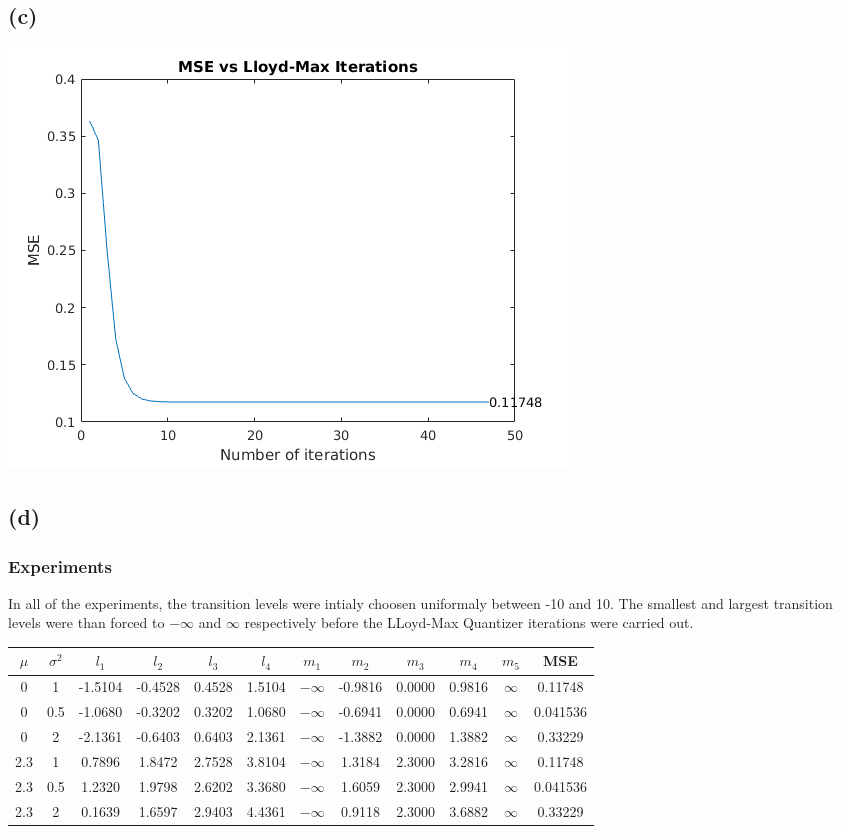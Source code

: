 \documentclass[a4paper,fleqn,11pt]{article}
\theoremstyle{mytheor}
\begin{document}
\subsection*{(c)}
\begin{center}
\includegraphics[scale=0.70]{../results/lloyd.png}
\end{center}
\subsection*{(d)}
\subsubsection*{Experiments}
In all of the experiments, the transition levels were intialy choosen uniformaly between -10 and 10. The smallest and largest transition levels were than forced to $-\infty$ and $\infty$ respectively before the LLoyd-Max Quantizer iterations were carried out. \\
\begin{tabular}{| c | c | c | c | c | c | c | c | c | c | c | c |}
	\hline
	$\mu$ &	$\sigma^2$ &$l_1$ &		$l_2$ &		$l_3$ &		$l_4$ &		$m_1$ &		$m_2$ &			$m_3$ &		$m_4$ &		$m_5$ &		MSE \\
	\hline
	0 &		1 &			-1.5104 &	-0.4528 &	0.4528 &	1.5104 &	$-\infty$ &	-0.9816 &	0.0000 &	0.9816 &	$\infty$ &	0.11748 \\
	\hline
	0 &		0.5 &		-1.0680 &	-0.3202 &	0.3202 &	1.0680 &	$-\infty$ &	-0.6941 &	0.0000 &	0.6941 &	$\infty$ &	0.041536 \\
	\hline
	0 &		2 &			-2.1361 &  	-0.6403 & 	0.6403 & 	2.1361 &	$-\infty$ &	-1.3882 &	0.0000 &	1.3882 &	$\infty$ &	0.33229 \\
	\hline
	2.3 &   1 &			0.7896 &	1.8472 &	2.7528 &	3.8104 &	$-\infty$ &	1.3184 &	2.3000 &	3.2816 &	$\infty$ &	0.11748 \\
	\hline
	2.3 &	0.5 &		1.2320 &	1.9798 &	2.6202 &	3.3680 &	$-\infty$ &	1.6059 &	2.3000 &	2.9941 &	$\infty$ &	0.041536 \\
	\hline
	2.3 &	2 &			0.1639 &	1.6597 & 	2.9403 &	4.4361 &	$-\infty$ &	0.9118 &	2.3000 &	3.6882 &	$\infty$ &	0.33229 \\
	\hline
\end{tabular}
\end{document}
